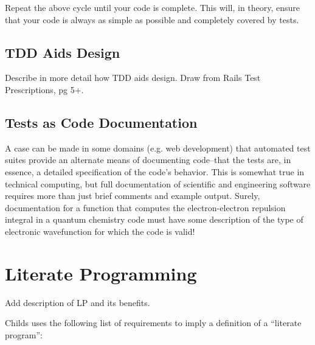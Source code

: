 Repeat the above cycle until your code is complete. This will, in theory, ensure that your code is
always as simple as possible and completely covered by tests. 

\subsection{TDD Aids Design}

\begin{TODO}
Describe in more detail how TDD aids design. Draw from Rails Test Prescriptions, pg 5+.
\end{TODO}

\subsection{Tests as Code Documentation}
A case can be made in some domains (e.g. web development) that automated test suites 
provide an alternate means of documenting code--that
the tests are, in essence, a detailed specification of the code's behavior. This is somewhat true in
technical computing, but full documentation of scientific and engineering software requires 
more than just brief comments and example output. Surely, documentation for a function that computes 
the electron-electron repulsion integral in a quantum chemistry code must have some description
of the type of electronic wavefunction for which the code is valid!

\section{Literate Programming}
\begin{TODO}
Add description of LP and its benefits. 
\end{TODO}

Childs\cite{childs} uses the following list of requirements to imply a definition of a ``literate program'': 

